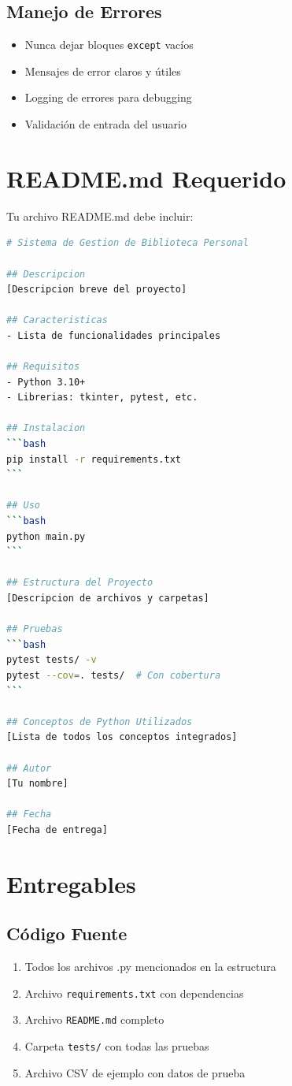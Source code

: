 \documentclass[12pt,a4paper]{article}
\begin{document}
\subsection{Manejo de Errores}
\begin{itemize}[leftmargin=*]
    \item Nunca dejar bloques \texttt{except} vacíos
    \item Mensajes de error claros y útiles
    \item Logging de errores para debugging
    \item Validación de entrada del usuario
\end{itemize}

\section{README.md Requerido}

Tu archivo README.md debe incluir:

\begin{lstlisting}[language=bash, caption=Contenido del README]
# Sistema de Gestion de Biblioteca Personal

## Descripcion
[Descripcion breve del proyecto]

## Caracteristicas
- Lista de funcionalidades principales

## Requisitos
- Python 3.10+
- Librerias: tkinter, pytest, etc.

## Instalacion
```bash
pip install -r requirements.txt
```

## Uso
```bash
python main.py
```

## Estructura del Proyecto
[Descripcion de archivos y carpetas]

## Pruebas
```bash
pytest tests/ -v
pytest --cov=. tests/  # Con cobertura
```

## Conceptos de Python Utilizados
[Lista de todos los conceptos integrados]

## Autor
[Tu nombre]

## Fecha
[Fecha de entrega]
\end{lstlisting}

\section{Entregables}

\subsection{Código Fuente}
\begin{enumerate}[leftmargin=*]
    \item Todos los archivos .py mencionados en la estructura
    \item Archivo \texttt{requirements.txt} con dependencias
    \item Archivo \texttt{README.md} completo
    \item Carpeta \texttt{tests/} con todas las pruebas
    \item Archivo CSV de ejemplo con datos de prueba
\end{enumerate}
\end{document}
